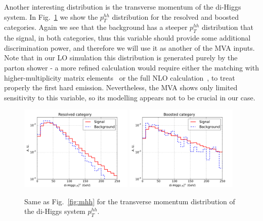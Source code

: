 Another interesting distribution is the transverse momentum of
the di-Higgs system.
%
In Fig.~\ref{fig:pthh} we show the $p_T^{hh}$
distribution
for the resolved and boosted categories.
%
Again we see that the background has a steeper $p_T^{hh}$ distribution
that the signal, in both categories, thus this variable
should provide some additional discrimination power, and therefore
we will use it as another of the MVA inputs.
%
Note that in our LO simulation this distribution is generated purely
by the parton shower - a more refined calculation would require
either the matching with higher-multiplicity matrix elements~\cite{Maierhofer:2013sha} or
the full NLO calculation~\cite{Frederix:2014hta}, to treat properly the first hard emission.
%
Nevertheless, the MVA shows only limited sensitivity to this variable, so its
modelling appears not to be crucial in our case.

\begin{figure}[t]
\begin{center}
  \includegraphics[width=0.48\textwidth]{plots/pt_HH_res_C1.pdf}
  \includegraphics[width=0.48\textwidth]{plots/pt_HH_boost_C1.pdf}
  \caption{\small Same as Fig.~\ref{fig:mhh} for the transverse momentum
    distribution of the di-Higgs system $p_T^{hh}$.
}
\label{fig:pthh}
\end{center}
\end{figure}

